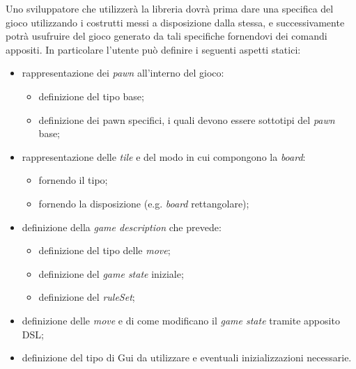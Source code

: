 Uno sviluppatore che utilizzerà la libreria dovrà prima dare una specifica del gioco utilizzando i costrutti messi a disposizione dalla stessa, e successivamente potrà usufruire del gioco generato da tali specifiche fornendovi dei comandi appositi.
%
In particolare l'utente può definire i seguenti aspetti statici:
%
\begin{itemize}
    \item rappresentazione dei \textit{pawn} all'interno del gioco:
          \begin{itemize}
              \item definizione del tipo base;
              \item definizione dei pawn specifici, i quali devono essere sottotipi del \textit{pawn} base;
          \end{itemize}
    \item rappresentazione delle \textit{tile} e del modo in cui compongono la \textit{board}:
          \begin{itemize}
              \item fornendo il tipo;
              \item fornendo la disposizione (e.g. \textit{board} rettangolare);
          \end{itemize}
    \item definizione della \textit{game description} che prevede:
          \begin{itemize}
              \item definizione del tipo delle \textit{move};
              \item definizione del \textit{game state} iniziale;
              \item definizione del \textit{ruleSet};
          \end{itemize}
    \item definizione delle \textit{move} e di come modificano il \textit{game state} tramite apposito DSL;
    \item definizione del tipo di Gui da utilizzare e eventuali inizializzazioni necessarie.
\end{itemize}
%

